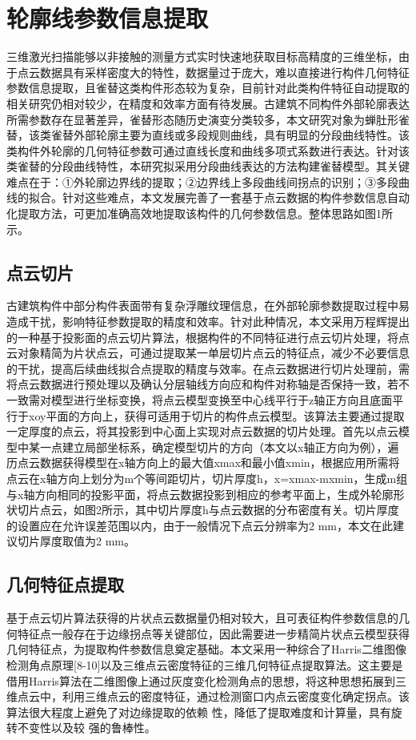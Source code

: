 \section{轮廓线参数信息提取}
三维激光扫描能够以非接触的测量方式实时快速地获取目标高精度的三维坐标，由于点云数据具有采样密度大的特性，数据量过于庞大，难以直接进行构件几何特征参数信息提取，且雀替这类构件形态较为复杂，目前针对此类构件特征自动提取的相关研究仍相对较少，在精度和效率方面有待发展。古建筑不同构件外部轮廓表达所需参数存在显著差异，雀替形态随历史演变分类较多，本文研究对象为蝉肚形雀替，该类雀替外部轮廓主要为直线或多段规则曲线，具有明显的分段曲线特性。该类构件外轮廓的几何特征参数可通过直线长度和曲线多项式系数进行表达。针对该类雀替的分段曲线特性，本研究拟采用分段曲线表达的方法构建雀替模型。其关键难点在于：①外轮廓边界线的提取；②边界线上多段曲线间拐点的识别；③多段曲线的拟合。针对这些难点，本文发展完善了一套基于点云数据的构件参数信息自动化提取方法，可更加准确高效地提取该构件的几何参数信息。整体思路如图1所示。

\subsection{点云切片}
古建筑构件中部分构件表面带有复杂浮雕纹理信息，在外部轮廓参数提取过程中易造成干扰，影响特征参数提取的精度和效率。针对此种情况，本文采用万程辉提出的一种基于投影面的点云切片算法，根据构件的不同特征进行点云切片处理，将点云对象精简为片状点云，可通过提取某一单层切片点云的特征点，减少不必要信息的干扰，提高后续曲线拟合点提取的精度与效率。在点云数据进行切片处理前，需将点云数据进行预处理以及确认分层轴线方向应和构件对称轴是否保持一致，若不一致需对模型进行坐标变换，将点云模型变换至中心线平行于z轴正方向且底面平行于xoy平面的方向上，获得可适用于切片的构件点云模型。该算法主要通过提取一定厚度的点云，将其投影到中心面上实现对点云数据的切片处理。首先以点云模型中某一点建立局部坐标系，确定模型切片的方向（本文以x轴正方向为例），遍历点云数据获得模型在x轴方向上的最大值xmax和最小值xmin，根据应用所需将点云在x轴方向上划分为m个等间距切片，切片厚度h，x=xmax-mxmin，生成m组与x轴方向相同的投影平面，将点云数据投影到相应的参考平面上，生成外轮廓形状切片点云，如图2所示，其中切片厚度h与点云数据的分布密度有关。切片厚度的设置应在允许误差范围以内，由于一般情况下点云分辨率为2 mm，本文在此建议切片厚度取值为2 mm。

\subsection{几何特征点提取}

基于点云切片算法获得的片状点云数据量仍相对较大，且可表征构件参数信息的几何特征点一般存在于边缘拐点等关键部位，因此需要进一步精简片状点云模型获得几何特征点，为提取构件参数信息奠定基础。本文采用一种综合了Harris二维图像检测角点原理[8-10]以及三维点云密度特征的三维几何特征点提取算法。这主要是借用Harris算法在二维图像上通过灰度变化检测角点的思想，将这种思想拓展到三维点云中，利用三维点云的密度特征，通过检测窗口内点云密度变化确定拐点。该算法很大程度上避免了对边缘提取的依赖
性，降低了提取难度和计算量，具有旋转不变性以及较
强的鲁棒性。

